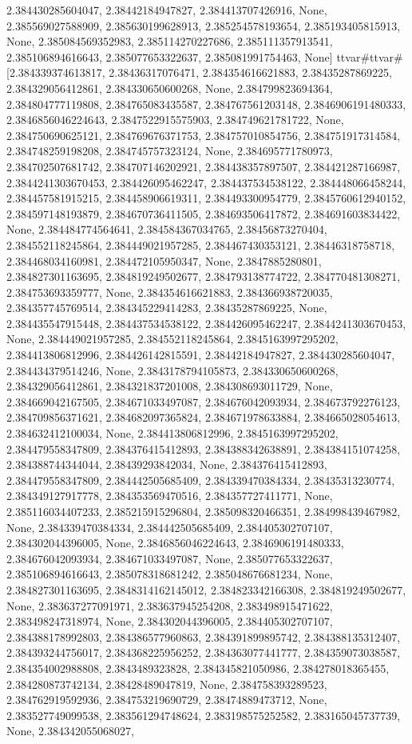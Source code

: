 \documentclass[
  11pt,
  french,
]{article}
\begin{document}
\begin{tcolorbox}[title= Répartition des volumes selon leurs caractéristiques ,colback=boitecode]
2.384430285604047, 2.38442184947827, 2.384413707426916, None, 2.385569027588909, 2.385630199628913, 2.385254578193654, 2.385193405815913, None, 2.385084569352983, 2.385114270227686, 2.385111357913541, 2.385106894616643, 2.385077653322637, 2.385081991754463, None]
ttvar{#}ttvar{#} [2.384339374613817, 2.38436317076471, 2.384354616621883, 2.38435287869225, 2.384329056412861, 2.384330650600268, None, 2.384799823694364, 2.384804777119808, 2.384765083435587, 2.384767561203148, 2.3846906191480333, 2.3846856046224643, 2.3847522915575903, 2.384749621781722, None, 2.384750690625121, 2.384769676371753, 2.384757010854756, 2.384751917314584, 2.384748259198208, 2.384745757323124, None, 2.384695771780973, 2.384702507681742, 2.384707146202921, 2.384438357897507, 2.384421287166987, 2.3844241303670453, 2.384426095462247, 2.384437534538122, 2.384448066458244, 2.384457581915215, 2.384458906619311, 2.384493300954779, 2.3845760612940152, 2.384597148193879, 2.384670736411505, 2.384693506417872, 2.384691603834422, None, 2.384484774564641, 2.384584367034765, 2.38456873270404, 2.384552118245864, 2.384449021957285, 2.384467430353121, 2.38446318758718, 2.384468034160981, 2.384472105950347, None, 2.3847885280801, 2.384827301163695, 2.384819249502677, 2.384793138774722, 2.384770481308271, 2.384753693359777, None, 2.384354616621883, 2.384366938720035, 2.384357745769514, 2.384345229414283, 2.38435287869225, None, 2.384435547915448, 2.384437534538122, 2.384426095462247, 2.3844241303670453, None, 2.384449021957285, 2.384552118245864, 2.3845163997295202, 2.384413806812996, 2.384426142815591, 2.38442184947827, 2.384430285604047, 2.384434379514246, None, 2.3843178794105873, 2.384330650600268, 2.384329056412861, 2.384321837201008, 2.384308693011729, None, 2.384669042167505, 2.384671033497087, 2.384676042093934, 2.384673792276123, 2.384709856371621, 2.384682097365824, 2.384671978633884, 2.384665028054613, 2.384632412100034, None, 2.384413806812996, 2.3845163997295202, 2.384479558347809, 2.384376415412893, 2.384388342638891, 2.384384151074258, 2.384388744344044, 2.38439293842034, None, 2.384376415412893, 2.384479558347809, 2.384442505685409, 2.384339470384334, 2.38435313230774, 2.384349127917778, 2.384353569470516, 2.384357727411771, None, 2.385116034407233, 2.385215915296804, 2.385098320466351, 2.384998439467982, None, 2.384339470384334, 2.384442505685409, 2.384405302707107, 2.384302044396005, None, 2.3846856046224643, 2.3846906191480333, 2.384676042093934, 2.384671033497087, None, 2.385077653322637, 2.385106894616643, 2.385078318681242, 2.385048676681234, None, 2.384827301163695, 2.3848314162145012, 2.384823342166308, 2.384819249502677, None, 2.383637277091971, 2.383637945254208, 2.383498915471622, 2.383498247318974, None, 2.384302044396005, 2.384405302707107, 2.384388178992803, 2.384386577960863, 2.384391899895742, 2.384388135312407, 2.384393244756017, 2.384368225956252, 2.384363077441777, 2.384359073038587, 2.384354002988808, 2.3843489323828, 2.384345821050986, 2.384278018365455, 2.384280873742134, 2.38428489047819, None, 2.384758393289523, 2.384762919592936, 2.384753219690729, 2.38474889473712, None, 2.383527749099538, 2.383561294748624, 2.383198575252582, 2.383165045737739, None, 2.384342055068027, 
\end{tcolorbox}
\end{document}
